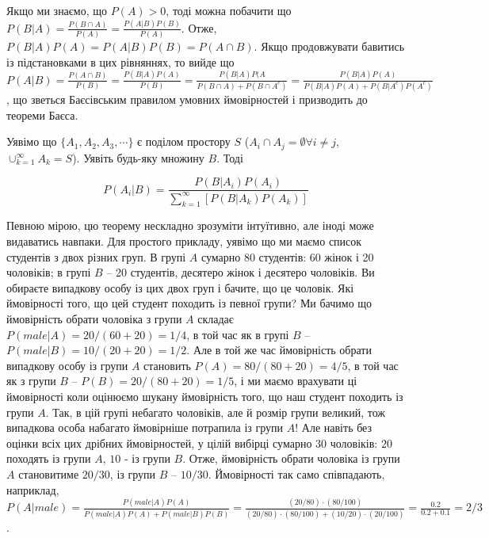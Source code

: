 \documentclass[
  11pt,
]{book}
\begin{document}
Якщо ми знаємо, що \(P(A)>0\), тоді можна побачити що
\(P(B|A) = \frac{P(B \cap A)}{P(A)} = \frac{P(A | B)P(B)}{P(A)}\). Отже,
\(P(B|A)P(A)=P(A|B)P(B)=P(A \cap B)\). Якщо продовжувати бавитись із
підстановками в цих рівняннях, то вийде що
\(P(A|B) = \frac{P(A \cap B)}{P(B)} = \frac{P(B|A) P(A)}{P(B)} = \frac{P(B|A)P(A}{P(B \cap A) + P(B \cap A^c)} = \frac{P(B|A)P(A)}{P(B|A) P(A) + P(B|A^c)P(A^c)}\),
що зветься Баєсівським правилом умовних ймовірностей і призводить до
теореми Баєса.

Уявімо що \(\{A_1, A_2, A_3, \cdots\}\) є поділом простору \(S\)
(\(A_i \cap A_j = \emptyset \forall i \neq j\),
\(\cup_{k=1}^{\infty} A_k = S\)). Уявіть будь-яку множину \(B\). Тоді

\[P(A_i|B) = \frac{P(B|A_i)P(A_i)}{\sum_{k=1}^{\infty}[P(B|A_k)P(A_k)]}\]

Певною мірою, цю теорему нескладно зрозуміти інтуїтивно, але іноді може
видаватись навпаки. Для простого прикладу, уявімо що ми маємо список
студентів з двох різних груп. В групі \(A\) сумарно 80 студентів: 60
жінок і 20 чоловіків; в групі \(B\) -- 20 студентів, десятеро жінок і
десятеро чоловіків. Ви обираєте випадкову особу із цих двох груп і
бачите, що це чоловік. Які ймовірності того, що цей студент походить із
певної групи? Ми бачимо що ймовірність обрати чоловіка з групи \(A\)
складає \(P(male|A) =  20/(60+20) = 1/4\), в той час як в групі \(B\) --
\(P(male|B) = 10/(20+20) = 1/2\). Але в той же час ймовірність обрати
випадкову особу із групи \(A\) становить \(P(A) = 80/(80+20) = 4/5\), в
той час як з групи \(B\) -- \(P(B) = 20/(80+20) = 1/5\), і ми маємо
врахувати ці ймовірності коли оцінюємо шукану ймовірність того, що наш
студент походить із групи \(A\). Так, в цій групі небагато чоловіків,
але й розмір групи великий, тож випадкова особа набагато ймовірніше
потрапила із групи \(A\)! Але навіть без оцінки всіх цих дрібних
ймовірностей, у цілій вибірці сумарно \(30\) чоловіків: \(20\) походять
із групи \(A\), \(10\) - із групи \(B\). Отже, ймовірність обрати
чоловіка із групи \(A\) становитиме \(20/30\), із групи \(B\) --
\(10/30\). Ймовірності так само співпадають, наприклад,
\(P(A|male) = \frac{P(male|A)P(A)}{P(male|A)P(A) + P(male|B)P(B)} = \frac{(20/80) \cdot (80/100)}{(20/80) \cdot (80/100) + (10/20) \cdot (20/100)} = \frac{0.2}{0.2+0.1}=2/3\).
\end{document}
